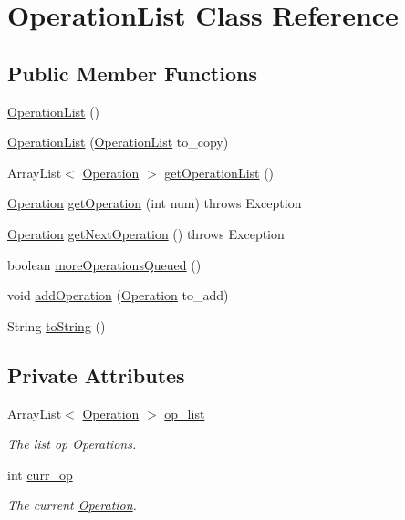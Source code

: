 \hypertarget{classOperationList}{
\section{OperationList Class Reference}
\label{classOperationList}
}
\subsection*{Public Member Functions}
\begin{DoxyCompactItemize}
\item 
\hyperlink{classOperationList_a1ab8693ff3f4043e023c0f3e55b5a22b}{OperationList} ()
\item 
\hyperlink{classOperationList_a8f3be80cbd49542d00ce5f122ba7e06b}{OperationList} (\hyperlink{classOperationList}{OperationList} to\_\-copy)
\item 
ArrayList$<$ \hyperlink{classOperation}{Operation} $>$ \hyperlink{classOperationList_a8eab211c05128d5926984a11e0342d8c}{getOperationList} ()
\item 
\hyperlink{classOperation}{Operation} \hyperlink{classOperationList_a0a2b5d92ab9462e4bdbcb8bbc52e7445}{getOperation} (int num)  throws Exception
\item 
\hyperlink{classOperation}{Operation} \hyperlink{classOperationList_a97099cc539ae05decfdd605393a6d112}{getNextOperation} ()  throws Exception
\item 
boolean \hyperlink{classOperationList_af3d91752e3eb3a37b506e23a713537b8}{moreOperationsQueued} ()
\item 
void \hyperlink{classOperationList_a2a4d8bcf86f75195c0f3602c0f531d25}{addOperation} (\hyperlink{classOperation}{Operation} to\_\-add)
\item 
String \hyperlink{classOperationList_afa338da3a6aaeebc5207c666faf1da9d}{toString} ()
\end{DoxyCompactItemize}
\subsection*{Private Attributes}
\begin{DoxyCompactItemize}
\item 
ArrayList$<$ \hyperlink{classOperation}{Operation} $>$ \hyperlink{classOperationList_ad738b2ec75b157d945eea5dbdb6b2b9e}{op\_\-list}
\begin{DoxyCompactList}\small\item\em The list op Operations. \item\end{DoxyCompactList}\item 
int \hyperlink{classOperationList_abbc30401d74aa280541791832c128a2b}{curr\_\-op}
\begin{DoxyCompactList}\small\item\em The current \hyperlink{classOperation}{Operation}. \item\end{DoxyCompactList}\end{DoxyCompactItemize}


